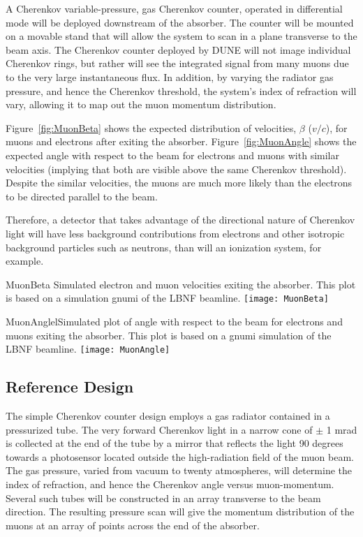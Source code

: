 A Cherenkov variable-pressure, gas Cherenkov counter, operated in differential mode
will be deployed downstream of the absorber.  The counter will be mounted on a movable 
stand that will allow the system to scan in a plane transverse to the beam axis. 
The Cherenkov counter deployed by DUNE will not image individual Cherenkov rings, but rather will see the
integrated signal from many muons due to the very large instantaneous flux. 
In addition, by varying the radiator gas pressure, and hence the 
Cherenkov threshold, the system's index of refraction will vary, 
allowing it to map out the muon momentum distribution.

Figure~\ref{fig:MuonBeta} shows the expected distribution of
velocities, $\beta$ ($v/c$), for muons and electrons after exiting the
absorber. 
Figure~\ref{fig:MuonAngle} shows the expected angle with respect to the beam for
electrons and muons with similar velocities (implying that both are visible above the 
same Cherenkov threshold).  Despite the similar velocities, the muons are much more likely
than the electrons to be directed parallel to the beam.

Therefore, a detector that takes advantage of the directional nature of Cherenkov
light will have less background contributions from electrons and other isotropic 
background particles such as neutrons, than will an ionization system, for example. 

\begin{cdrfigure}{MuonBeta}
{Simulated electron and muon velocities exiting the absorber. This plot is based on a 
simulation gnumi\cite{GNuMI} of the LBNF beamline.}
\texttt{[image: MuonBeta]}
\end{cdrfigure}


\begin{cdrfigure}{MuonAngle}{lSimulated plot of angle with respect to the beam for 
electrons and muons exiting the absorber.
This plot is based on a gnumi simulation of the LBNF beamline.}
\texttt{[image: MuonAngle]}
\end{cdrfigure}


\subsection{Reference Design}

The simple Cherenkov counter design
employs a gas radiator contained in a pressurized tube. The very forward
Cherenkov light in a narrow cone of $\pm$ 1 mrad is collected at the end of the tube
by a mirror that reflects the light 90 degrees towards a photosensor
located outside the high-radiation field of the muon beam. The gas
pressure, varied from vacuum to twenty atmospheres, will determine
the index of refraction, and hence the Cherenkov angle versus muon-momentum. 
Several such tubes will be constructed in an array
transverse to the beam direction. The resulting pressure scan will
give the momentum distribution of the muons at an array of points
across the end of the absorber.  

